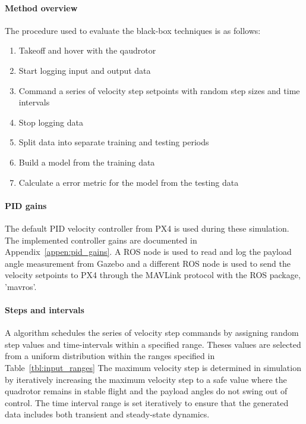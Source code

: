         \paragraph{Method overview}
        The procedure used to evaluate the black-box techniques is as follows:
        \begin{enumerate}
            \item Takeoff and hover with the qaudrotor
            \item Start logging input and output data
            \item Command a series of velocity step setpoints with random step sizes and time intervals
            \item Stop logging data
            \item Split data into separate training and testing periods
            \item Build a model from the training data
            \item Calculate a error metric for the model from the testing data
        \end{enumerate}

        \paragraph{PID gains}
        The default PID velocity controller from PX4 is used during these simulation.
        The implemented controller gains are documented in Appendix~\ref{appen:pid_gains}.
        A ROS node is used to read and log the payload angle measurement from Gazebo and a different
        ROS node is used to send the velocity setpoints to PX4 
        through the MAVLink protocol with the ROS package, 'mavros'.

        \paragraph{Steps and intervals}
        A algorithm schedules the series of velocity step commands 
        by assigning random step values and time-intervals within a specified range.
        Theses values are selected from a uniform distribution 
        within the ranges specified in Table~\ref{tbl:input_ranges}
        The maximum velocity step is determined in simulation by iteratively increasing the maximum velocity step 
        to a safe value where the quadrotor remains in stable flight
        and the payload angles do not swing out of control.
        The time interval range is set iteratively to ensure 
        that the generated data includes both transient and steady-state dynamics.
 

